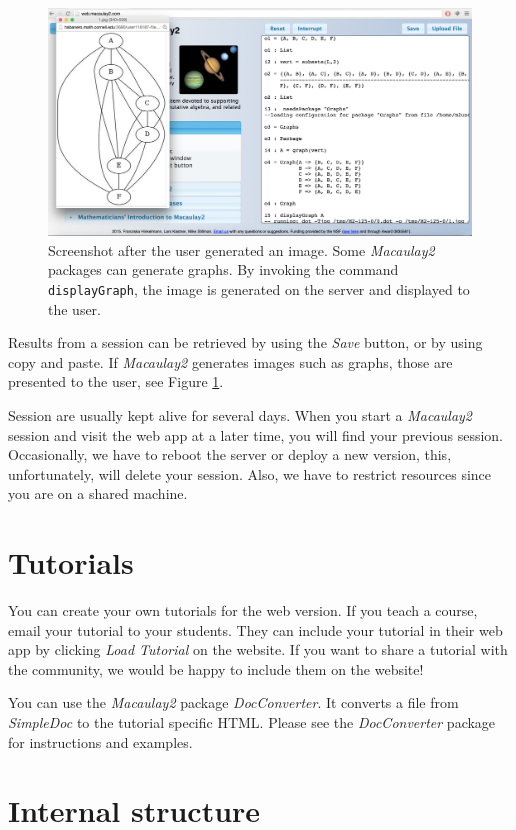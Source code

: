\documentclass[twocolumn]{article}
\def\M2{{\it Macaulay2}}
\begin{document}
\begin{figure}[htb]
    \includegraphics[width=.95\textwidth]{withGraph.jpg}
    \caption{Screenshot after the user
      generated an image. Some \M2 packages can generate
      graphs. By invoking the command {\tt displayGraph}, the image is
      generated on the server and displayed to the user.}
    \label{fig:graph}
\end{figure}

Results from a session can be retrieved by using the {\it Save}
button, or by using copy and paste. If \M2 generates
images such as graphs, those are presented to the user, see Figure \ref{fig:graph}.


Session are usually kept alive for several days. When you start a \M2 session and visit the web app at a later time, 
you will find your previous session. Occasionally, 
we have to reboot the server or deploy a new version, this, 
unfortunately, will delete your session. Also, we have to restrict resources since you are on a shared machine.

\section{Tutorials}

You can create your own tutorials for the web version. If you teach a course,
email your tutorial to your students. They can include your tutorial in their web app by clicking
{\it Load Tutorial} on the website.
If you want to share a tutorial with the community, we would
be happy to include them on the website!

You can use the \M2 package {\it DocConverter}.
It converts a file from {\it SimpleDoc} to the tutorial specific HTML. Please see the
{\it DocConverter} package for instructions and examples.


\section{Internal structure}
\end{document}
